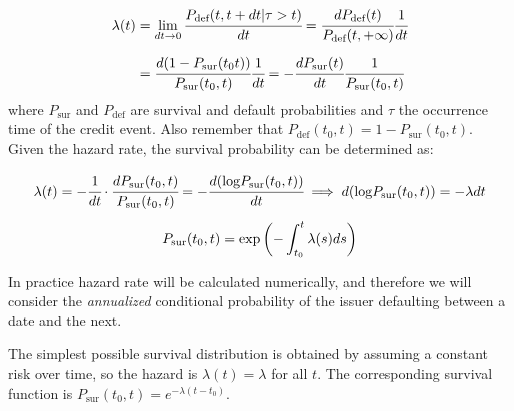 \begin{equation}
\begin{split}
\lambda(t)& = \lim_{dt\rightarrow 0} \cfrac{P_{\textrm{def}}(t, t+dt|\tau> t)}{dt} = \cfrac{dP_{\textrm{def}}(t)}{P_{\textrm{def}}(t, +\infty)}\cfrac{1}{dt}\\[5 pt] &
= \cfrac{d(1-P_{\textrm{sur}}(t_0 t))}{P_{\textrm{sur}}(t_0, t)}\cfrac{1}{dt} = -\cfrac{dP_{\textrm{sur}}(t)}{dt}\cfrac{1}{P_{\textrm{sur}}(t_0, t)}
\end{split}
\end{equation}
where $P_{\textrm{sur}}$ and $P_{\textrm{def}}$ are survival and default probabilities and $\tau$ the occurrence time of the credit event.
Also remember that $P_{\textrm{def}}(t_0, t) = 1 - P_{\textrm{sur}}(t_0, t)$. Given the hazard rate, the survival probability can be determined as:


\begin{equation}
\begin{gathered}
\lambda(t) = -\cfrac{1}{dt}\cdot\cfrac{dP_{\textrm{sur}}(t_0, t)}{P_{\textrm{sur}}(t_0, t)} = -\cfrac{d(\textrm{log}P_{\textrm{sur}}(t_0, t))}{dt} \implies d(\textrm{log}P_{\textrm{sur}}(t_0, t)) = -\lambda dt\\[5pt]
P_{\textrm{sur}}(t_0, t) = \mathrm{exp}\left(-\int_{t_0}^{t}\lambda(s) ds\right)
\end{gathered}
\end{equation}

In practice hazard rate will be calculated numerically, and therefore we will consider the \emph{annualized} conditional probability of the issuer defaulting between a date and the next.

\label{sec:constant_hazard_rate}
The simplest possible survival distribution is obtained by assuming a constant risk over time, so the hazard is $\lambda (t)=\lambda$ for all $t$. The corresponding survival function is $P_{\textrm{sur}}(t_0, t) = e^{−\lambda (t-t_0)}$.

